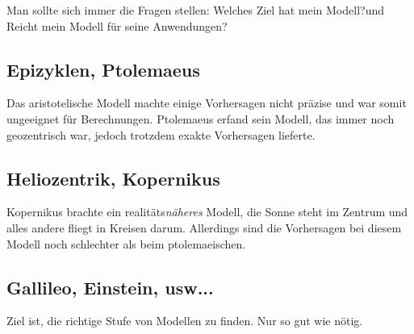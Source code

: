 \documentclass[11pt, a4paper]{article}
\begin{document}
\begin{figure}[H]
\centering
{}
\end{figure}

Man sollte sich immer die Fragen stellen: \glqq Welches Ziel hat mein Modell?\grqq und \glqq Reicht mein Modell für seine Anwendungen?\grqq

\subsection{Epizyklen, Ptolemaeus}
Das aristotelische Modell machte einige Vorhersagen nicht präzise und war somit ungeeignet für Berechnungen. Ptolemaeus erfand sein Modell, das immer noch geozentrisch war, jedoch trotzdem exakte Vorhersagen lieferte.

\begin{figure}[H]
\centering
{}
\end{figure}

\subsection{Heliozentrik, Kopernikus}
Kopernikus brachte ein realitäts\emph{näheres} Modell, die Sonne steht im Zentrum und alles andere fliegt in Kreisen darum. Allerdings sind die Vorhersagen bei diesem Modell noch schlechter als beim ptolemaeischen.

\begin{figure}[H]
\centering
{}
\end{figure}

\subsection{Gallileo, Einstein, usw...}


Ziel ist, die richtige Stufe von Modellen zu finden.
\glqq Nur so gut wie nötig\grqq.


\end{document}

